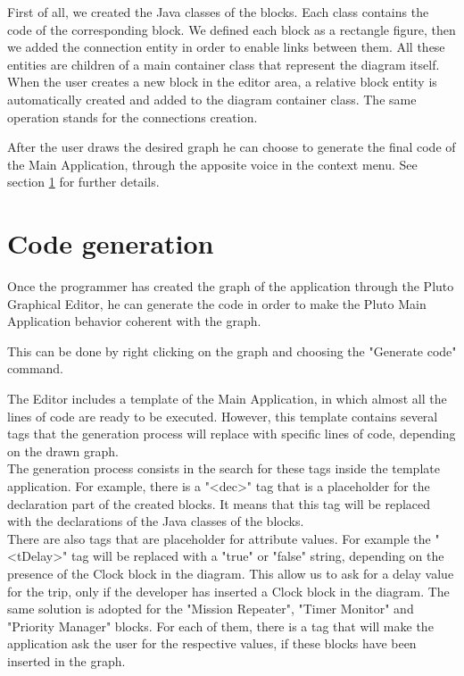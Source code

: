 First of all, we created the Java classes of the blocks. Each class contains the code of the corresponding block.
We defined each block as a rectangle figure, then we added the connection entity in order to enable links between them. All these entities are children of a main container class that represent the diagram itself.
\\

When the user creates a new  block in the editor area, a relative block entity is automatically created and added to the diagram container class. The same operation stands for the connections creation.

After the user draws the desired graph he can choose to generate the final code of the Main Application, through the apposite voice in the context menu.
See section \ref{codeGeneration} for further details.
\\

\section{Code generation}\label{codeGeneration}

Once the programmer has created the graph of the application through the Pluto Graphical Editor, he can generate the code in order to make the Pluto Main Application behavior coherent with the graph.

This can be done by right clicking on the graph and choosing the "Generate code" command.

The Editor includes a template of the Main Application, in which  almost all the lines of code are ready to be executed.
However, this template contains several tags that the generation process will replace with specific lines of code, depending on the drawn graph.
\\

The generation process consists in the search for these tags inside the template application.
For example, there is a "<dec>" tag that is a placeholder for the declaration part of the created blocks. It means that this tag will be replaced with the declarations of the Java classes of the blocks.
\\

There are also tags that are placeholder for attribute values.
For example the "<tDelay>" tag will be replaced with a "true" or "false" string, depending on the presence of the Clock block in the diagram. 
This allow us to ask for a delay value for the trip, only if the developer has inserted a Clock block in the diagram. 
The same solution is adopted for the "Mission Repeater", "Timer Monitor" and "Priority Manager" blocks.
For each of them, there is a tag that will make the application ask the user for the respective values, if these blocks have been inserted in the graph.
\\

